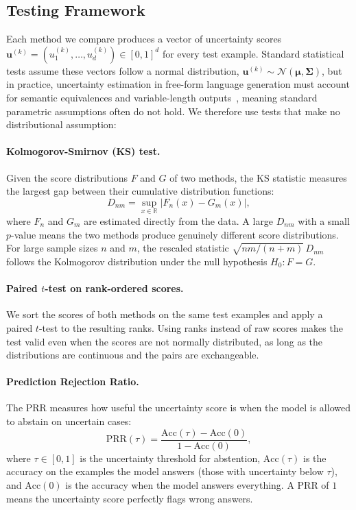 \documentclass[twoside]{article}
\begin{document}
\subsection{Testing Framework}

Each method we compare produces a vector of uncertainty scores
$\mathbf{u}^{(k)} = (u_1^{(k)},\ldots,u_d^{(k)}) \in [0,1]^d$ for
every test example. Standard statistical tests assume these vectors
follow a normal distribution,
$\mathbf{u}^{(k)} \sim \mathcal{N}(\boldsymbol{\mu},\boldsymbol{\Sigma})$,
but in practice, uncertainty estimation in free-form language generation must account for semantic equivalences and variable-length outputs~\cite{kuhn2023semantic}, meaning standard parametric assumptions often do not hold. We therefore use tests that make no distributional assumption:

\paragraph{Kolmogorov-Smirnov (KS) test.}
Given the score distributions $F$ and $G$ of two methods, the KS
statistic measures the largest gap between their cumulative distribution
functions:
\begin{equation}
  D_{nm} = \sup_{x\in\mathbb{R}}\bigl|F_n(x)-G_m(x)\bigr|,
\end{equation}
where $F_n$ and $G_m$ are estimated directly from the data. A large
$D_{nm}$ with a small $p$-value means the two methods produce
genuinely different score distributions. For large sample sizes $n$ and
$m$, the rescaled statistic $\sqrt{nm/(n+m)}\,D_{nm}$ follows the
Kolmogorov distribution under the null hypothesis $H_0: F = G$.

\paragraph{Paired $t$-test on rank-ordered scores.}
We sort the scores of both methods on the same test examples and apply
a paired $t$-test to the resulting ranks. Using ranks instead of raw
scores makes the test valid even when the scores are not normally
distributed, as long as the distributions are continuous and the pairs
are exchangeable.

\paragraph{Prediction Rejection Ratio.}
The PRR measures how useful the uncertainty score is when the model is
allowed to abstain on uncertain cases:
\begin{equation}
  \mathrm{PRR}(\tau) =
  \frac{\mathrm{Acc}(\tau) - \mathrm{Acc}(0)}
       {1 - \mathrm{Acc}(0)},
\end{equation}
where $\tau \in [0,1]$ is the uncertainty threshold for abstention, $\mathrm{Acc}(\tau)$ is the accuracy on the examples the model
answers (those with uncertainty below $\tau$), and $\mathrm{Acc}(0)$ is
the accuracy when the model answers everything. A PRR of $1$ means the
uncertainty score perfectly flags wrong answers.
\end{document}
